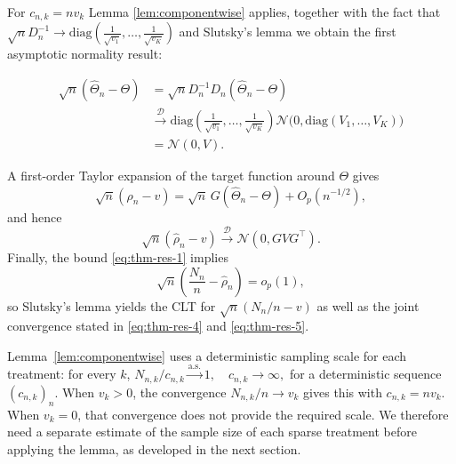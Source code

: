 		
		{\color{revisiongreen} For \(c_{n,k} = n v_k\) Lemma \ref{lem:componentwise} applies, } together with the fact
		that \(\sqrt n D_n^{-1} \to \mathrm{diag}\left(\frac{1}{\sqrt{v_1}},\allowbreak\ldots,\frac{1}{\sqrt{v_K}}\right)\) 
		and Slutsky's lemma we obtain the first asymptotic normality result:
		
		\begin{align*}
			\sqrt n(\hat\Theta_n-\Theta) &= \sqrt n D_n^{-1} D_n(\hat\Theta_n-\Theta)\\
			&\xrightarrow{\mathcal{D}}\mathrm{diag}\left(\frac{1}{\sqrt{v_1}},\ldots,\frac{1}{\sqrt{v_K}}\right) \mathcal N\!\big(0,\mathrm{diag}\left(V_1,\dots,V_K\right)\big)\\ 
			&= \mathcal N(0,V).
		\end{align*}

	
	A first-order Taylor expansion of the target function around $\Theta$ gives
	\[
	\sqrt{n}\left(\hat\rho_n-v\right)
	= \sqrt{n}\,G(\hat\Theta_n-\Theta) + O_p(n^{-1/2}),
	\]
	and hence
	\[
	\sqrt n(\hat\rho_n-v)\xrightarrow{\mathcal{D}}\mathcal N(0,GVG^\top).
	\]
	Finally, the bound \eqref{eq:thm-res-1} implies
	\[
	\sqrt n\!\left(\frac{N_n}{n}-\hat\rho_n\right)=o_p(1),
	\]
	so Slutsky’s lemma yields the CLT for $\sqrt n(N_n/n-v)$ as well as the joint convergence stated in \eqref{eq:thm-res-4} and \eqref{eq:thm-res-5}.
	
	{\color{revisiongreen} \begin{remark}
Lemma~\ref{lem:componentwise} uses a deterministic sampling scale for each treatment: for every \(k\),
\(N_{n,k}/c_{n,k}\xrightarrow{\mathrm{a.s.}}1,
\quad c_{n,k}\longrightarrow\infty,
\)
for a deterministic sequence \((c_{n,k})_n\). When \(v_k>0\), the convergence \(N_{n,k}/n\to v_k\) gives this with \(c_{n,k}=nv_k\). When \(v_k=0\), that convergence does not provide the required scale. We therefore need a separate estimate of the sample size of each sparse treatment before applying the lemma, as developed in the next section.
\end{remark}}

	
